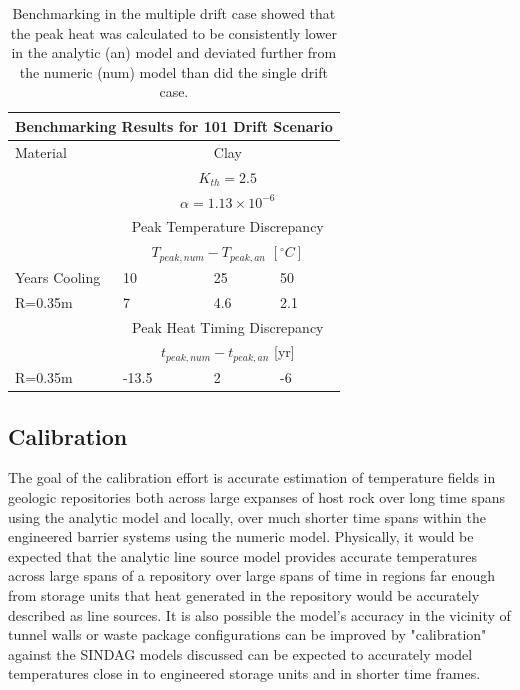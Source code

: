 \documentclass{anstrans}
\begin{document}
\begin{table}
  \centering
  \footnotesize{
  \begin{tabular}{|l|l|l|l|}
    \multicolumn{4}{c}{\textbf{Benchmarking Results for 101 Drift Scenario}}\\
    \hline
    Material & \multicolumn{3}{|c|}{Clay} \\
    & \multicolumn{3}{|c|}{$K_{th}=2.5$}\\ 
    & \multicolumn{3}{|c|}{$\alpha=1.13\times10^{-6}$}  \\
    \hline
    & \multicolumn{3}{|c|}{Peak Temperature Discrepancy} \\
    & \multicolumn{3}{|c|}{$T_{peak,num}-T_{peak,an}$ $[^{\circ}C]$} \\
    \hline
    Years Cooling  & 10  & 25 & 50 \\
    \hline
    R=0.35m   & 7 & 4.6 & 2.1 \\
    \hline
    &\multicolumn{3}{|c|}{Peak Heat Timing Discrepancy}\\
    &\multicolumn{3}{|c|}{ $t_{peak,num}-t_{peak,an}$ [yr]} \\
    \hline
    R=0.35m       & -13.5   & 2   & -6  \\
    \hline
  \end{tabular}
  \caption{Benchmarking in the multiple drift case showed that the peak heat was 
  calculated to be consistently lower in the analytic (an) model and deviated further
  from the numeric (num)  model than did the single drift case.
  }
  \label{tab:benchMulti}
  }
\end{table}


\subsection{Calibration}

The goal of the calibration effort is accurate estimation of temperature fields in 
geologic repositories both across large expanses of host rock over long time 
spans using the analytic model and locally, over much shorter time spans within the 
engineered barrier systems using the numeric model.  Physically, it would be expected 
that the analytic line source model provides accurate temperatures across large spans
of a repository over large spans of time in regions far enough from storage units that 
heat generated in the repository would be accurately described as line sources. It is also
possible the model's accuracy in the vicinity of tunnel walls or waste package 
configurations can be improved by "calibration" against the SINDAG models discussed can  
be expected to accurately model temperatures close in to engineered storage units 
and in shorter time frames.
\end{document}
